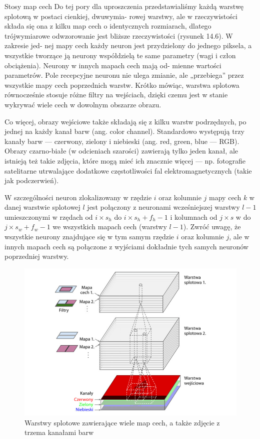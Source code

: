 \documentclass[12pt]{mwbk}
\theoremstyle{plain}
\theoremstyle{definition}
\theoremstyle{remark}
\newcommand\zrodlo[1]{\par\vspace{-3mm}{\small\textit{Źródło: }#1 }}
\begin{document}
Stosy map cech
Do tej pory dla uproszczenia przedstawialiśmy każdą warstwę splotową w postaci cienkiej, dwuwymia-
rowej warstwy, ale w rzeczywistości składa się ona z kilku map cech o identycznych rozmiarach,
dlatego trójwymiarowe odwzorowanie jest bliższe rzeczywistości (rysunek 14.6). W zakresie jed-
nej mapy cech każdy neuron jest przydzielony do jednego piksela, a wszystkie tworzące ją neurony
współdzielą te same parametry (wagi i człon obciążenia). Neurony w innych mapach cech mają od-
mienne wartości parametrów. Pole recepcyjne neuronu nie ulega zmianie, ale „przebiega” przez
wszystkie mapy cech poprzednich warstw. Krótko mówiąc, warstwa splotowa równocześnie stosuje
różne filtry na wejściach, dzięki czemu jest w stanie wykrywać wiele cech w dowolnym obszarze obrazu.

Co więcej, obrazy wejściowe także składają się z kilku warstw podrzędnych, po jednej na każdy kanał
barw (ang. color channel). Standardowo występują trzy kanały barw — czerwony, zielony i niebieski
(ang. red, green, blue — RGB). Obrazy czarno-białe (w odcieniach szarości) zawierają tylko jeden
kanał, ale istnieją też takie zdjęcia, które mogą mieć ich znacznie więcej — np. fotografie satelitarne
utrwalające dodatkowe częstotliwości fal elektromagnetycznych (takie jak podczerwień).

W szczególności neuron zlokalizowany w rzędzie $i$ oraz kolumnie $j$ mapy cech $k$ w danej warstwie
splotowej $l$ jest połączony z neuronami wcześniejszej warstwy $l-1$ umieszczonymi w rzędach od $i\times s_h$
do $i\times s_h +f_h -1$ i kolumnach od $j\times s$ w do $j\times s_w +f_w -1$ we wszystkich mapach cech (warstwy $l-1$). Zwróć
uwagę, że wszystkie neurony znajdujące się w tym samym rzędzie $i$ oraz kolumnie $j$, ale w innych
mapach cech są połączone z wyjściami dokładnie tych samych neuronów poprzedniej warstwy.

\begin{figure}[!h]
	\centering
	\includegraphics[width=\linewidth]{rys/warstwy_cnn_kanaly.png}
	\caption{Warstwy splotowe zawierające wiele map cech, a także zdjęcie z trzema kanałami barw}
	\zrodlo{\cite{geron}}
	\label{fig:warstwy-kanaly}
\end{figure}
\end{document}
